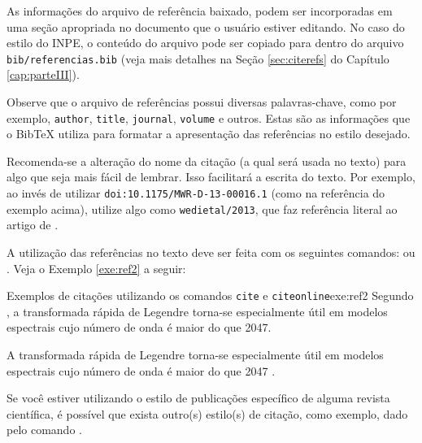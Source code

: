 As informações do arquivo de referência baixado, podem ser incorporadas em uma seção apropriada no documento que o usuário estiver editando. No caso do estilo do INPE, o conteúdo do arquivo pode ser copiado para dentro do arquivo {\tt bib/referencias.bib} (veja mais detalhes na Seção \ref{sec:citerefs} do Capítulo \ref{cap:parteIII}).

Observe que o arquivo de referências possui diversas palavras-chave, como por exemplo, {\tt author}, {\tt title}, {\tt journal}, {\tt volume} e outros. Estas são as informações que o Bib\TeX{} utiliza para formatar a apresentação das referências no estilo desejado.

\begin{marker}
Recomenda-se a alteração do nome da citação (a qual será usada no texto) para algo que seja mais fácil de lembrar. Isso facilitará a escrita do texto. Por exemplo, ao invés de utilizar {\tt doi:10.1175/MWR-D-13-00016.1} (como na referência do exemplo acima), utilize algo como {\tt wedietal/2013}, que faz referência literal ao artigo de .
\end{marker}

A utilização das referências no texto deve ser feita com os seguintes comandos: \texttt{\cite{referencia}} ou \texttt{}. Veja o Exemplo \ref{exe:ref2} a seguir:

\begin{texexptitled}[breakable,center lower,enhanced,middle=2mm]{Exemplos de citações utilizando os comandos {\tt cite} e {\tt citeonline}}{exe:ref2}
Segundo , a transformada rápida de Legendre torna-se especialmente útil em modelos espectrais cujo número de onda é maior do que 2047.

A transformada rápida de Legendre torna-se especialmente útil em modelos espectrais cujo número de onda é maior do que 2047 \cite{wedietal/2013}.
\end{texexptitled}

\begin{marker}
Se você estiver utilizando o estilo de publicações específico de alguma revista científica, é possível que exista outro(s) estilo(s) de citação, como exemplo, dado pelo comando .
\end{marker}

